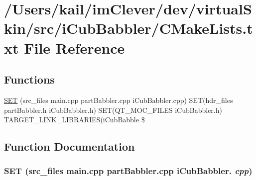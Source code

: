 \hypertarget{src_2i_cub_babbler_2_c_make_lists_8txt}{
\section{/Users/kail/imClever/dev/virtualSkin/src/iCubBabbler/CMakeLists.txt File Reference}
\label{src_2i_cub_babbler_2_c_make_lists_8txt}
}
\subsection*{Functions}
\begin{DoxyCompactItemize}
\item 
\hyperlink{src_2i_cub_babbler_2_c_make_lists_8txt_a58b0bb7fd579cf05de4e9f0b70ecfe2d}{SET} (src\_\-files main.cpp partBabbler.cpp iCubBabbler.cpp) SET(hdr\_\-files partBabbler.h iCubBabbler.h) SET(QT\_\-MOC\_\-FILES iCubBabbler.h) TARGET\_\-LINK\_\-LIBRARIES(iCubBabble \$
\end{DoxyCompactItemize}


\subsection{Function Documentation}
\hypertarget{src_2i_cub_babbler_2_c_make_lists_8txt_a58b0bb7fd579cf05de4e9f0b70ecfe2d}{
\subsubsection[{SET}]{\setlength{\rightskip}{0pt plus 5cm}SET (src\_\-files main.cpp partBabbler.cpp iCubBabbler. {\em cpp})}}
\label{src_2i_cub_babbler_2_c_make_lists_8txt_a58b0bb7fd579cf05de4e9f0b70ecfe2d}
